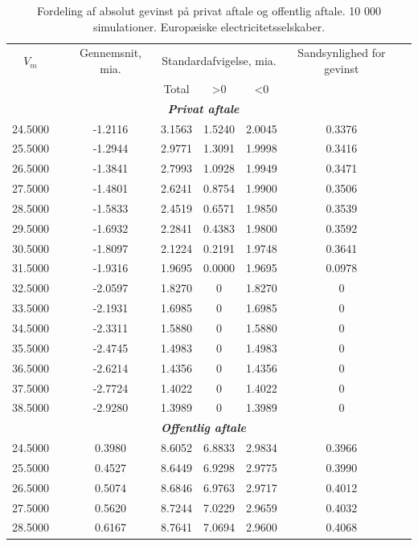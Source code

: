 \documentclass{article}
\begin{document}
\begin{table}[h]
	\caption{Fordeling af absolut gevinst p\aa{} privat aftale og offentlig aftale. 10 000 simulationer. Europæiske electricitetsselskaber.}
	\label{tab:abs_fordeling}
	\begin{tabularx}{0.95\linewidth}{cXcccccr}
	\toprule[1pt] 
	$V_m$ && Gennemsnit, mia. & \multicolumn{3}{c}{Standardafvigelse, mia.}  & Sandsynlighed for gevinst\\
	& & &Total & >0 & <0 \\
	\hline 
	\multicolumn{7}{c}{\emph{\textbf{Privat aftale}}} \\
24.5000&&-1.2116& 3.1563& 1.5240& 2.0045& 0.3376\\
25.5000&&-1.2944& 2.9771& 1.3091& 1.9998& 0.3416\\
26.5000&&-1.3841& 2.7993& 1.0928& 1.9949& 0.3471\\
27.5000&&-1.4801& 2.6241& 0.8754& 1.9900& 0.3506\\
28.5000&&-1.5833& 2.4519& 0.6571& 1.9850& 0.3539\\
29.5000&&-1.6932& 2.2841& 0.4383& 1.9800& 0.3592\\
30.5000&&-1.8097& 2.1224& 0.2191& 1.9748& 0.3641\\
31.5000&&-1.9316& 1.9695& 0.0000& 1.9695& 0.0978\\
32.5000&&-2.0597& 1.8270&0& 1.8270&0\\
33.5000&&-2.1931& 1.6985&0& 1.6985&0\\
34.5000&&-2.3311& 1.5880&0& 1.5880&0\\
35.5000&&-2.4745& 1.4983&0& 1.4983&0\\
36.5000&&-2.6214& 1.4356&0& 1.4356&0\\
37.5000&&-2.7724& 1.4022&0& 1.4022&0\\
38.5000&&-2.9280& 1.3989&0& 1.3989&0\\
\multicolumn{7}{c}{\emph{\textbf{Offentlig aftale}}} \\
 24.5000&&0.3980&8.6052&6.8833&2.9834&0.3966 \\
 25.5000&&0.4527&8.6449&6.9298&2.9775&0.3990\\
 26.5000&&0.5074&8.6846&6.9763&2.9717&0.4012\\
 27.5000&&0.5620&8.7244&7.0229&2.9659&0.4032\\
 28.5000&&0.6167&8.7641&7.0694&2.9600&0.4068\\

\end{tabularx}
\end{table}
\end{document}
